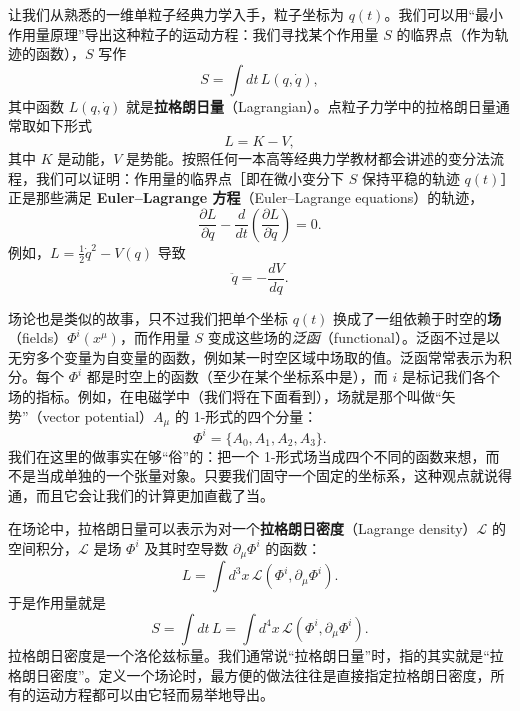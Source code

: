 让我们从熟悉的一维单粒子经典力学入手，粒子坐标为 $q(t)$。我们可以用“最小作用量原理”导出这种粒子的运动方程：我们寻找某个作用量 $S$ 的临界点（作为轨迹的函数），$S$ 写作
\begin{equation*}
S = \int dt\, L(q, \dot{q}),
\tag{1.126}
\end{equation*}
其中函数 $L(q,\dot{q})$ 就是\textbf{拉格朗日量}（Lagrangian）。点粒子力学中的拉格朗日量通常取如下形式
\begin{equation*}
L = K - V,
\tag{1.127}
\end{equation*}
其中 $K$ 是动能，$V$ 是势能。按照任何一本高等经典力学教材都会讲述的变分法流程，我们可以证明：作用量的临界点［即在微小变分下 $S$ 保持平稳的轨迹 $q(t)$］正是那些满足 \textbf{Euler--Lagrange 方程}（Euler--Lagrange equations）的轨迹，
\begin{equation*}
\frac{\partial L}{\partial q} - \frac{d}{dt}\left(\frac{\partial L}{\partial \dot{q}}\right) = 0.
\tag{1.128}
\end{equation*}
例如，$L = \frac{1}{2}\dot{q}^{2} - V(q)$ 导致
\begin{equation*}
\ddot{q} = -\frac{dV}{dq}.
\tag{1.129}
\end{equation*}

场论也是类似的故事，只不过我们把单个坐标 $q(t)$ 换成了一组依赖于时空的\textbf{场}（fields）$\Phi^{i}(x^{\mu})$，而作用量 $S$ 变成这些场的\emph{泛函}（functional）。泛函不过是以无穷多个变量为自变量的函数，例如某一时空区域中场取的值。泛函常常表示为积分。每个 $\Phi^{i}$ 都是时空上的函数（至少在某个坐标系中是），而 $i$ 是标记我们各个场的指标。例如，在电磁学中（我们将在下面看到），场就是那个叫做“矢势”（vector potential）$A_{\mu}$ 的 1-形式的四个分量：
\begin{equation*}
\Phi^{i} = \{A_{0}, A_{1}, A_{2}, A_{3}\}.
\tag{1.130}
\end{equation*}
我们在这里的做事实在够“俗”的：把一个 1-形式场当成四个不同的函数来想，而不是当成单独的一个张量对象。只要我们固守一个固定的坐标系，这种观点就说得通，而且它会让我们的计算更加直截了当。

在场论中，拉格朗日量可以表示为对一个\textbf{拉格朗日密度}（Lagrange density）$\mathcal{L}$ 的空间积分，$\mathcal{L}$ 是场 $\Phi^{i}$ 及其时空导数 $\partial_{\mu}\Phi^{i}$ 的函数：
\begin{equation*}
L = \int d^{3}x\, \mathcal{L}(\Phi^{i}, \partial_{\mu}\Phi^{i}).
\tag{1.131}
\end{equation*}
于是作用量就是
\begin{equation*}
S = \int dt\, L = \int d^{4}x\, \mathcal{L}(\Phi^{i}, \partial_{\mu}\Phi^{i}).
\tag{1.132}
\end{equation*}
拉格朗日密度是一个洛伦兹标量。我们通常说“拉格朗日量”时，指的其实就是“拉格朗日密度”。定义一个场论时，最方便的做法往往是直接指定拉格朗日密度，所有的运动方程都可以由它轻而易举地导出。

